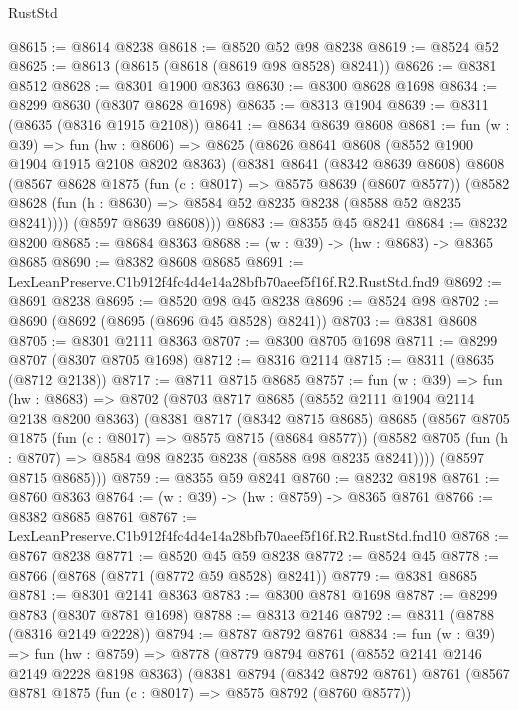\begin{lexlean}{RustStd}
\begin{coremodule}
@8615 := @8614 @8238
@8618 := @8520 @52 @98 @8238
@8619 := @8524 @52
@8625 := @8613 (@8615 (@8618 (@8619 @98 @8528) @8241))
@8626 := @8381 @8512
@8628 := @8301 @1900 @8363
@8630 := @8300 @8628 @1698
@8634 := @8299 @8630 (@8307 @8628 @1698)
@8635 := @8313 @1904
@8639 := @8311 (@8635 (@8316 @1915 @2108))
@8641 := @8634 @8639 @8608
@8681 := fun (w : @39) =>
  fun (hw : @8606) =>
  @8625
    (@8626
      @8641
      @8608
      (@8552 @1900 @1904 @1915 @2108 @8202 @8363)
      (@8381
        @8641
        (@8342 @8639 @8608)
        @8608
        (@8567
          @8628
          @1875
          (fun (c : @8017) => @8575 @8639 (@8607 @8577))
          (@8582 @8628 (fun (h : @8630) => @8584 @52 @8235 @8238 (@8588 @52 @8235 @8241))))
        (@8597 @8639 @8608)))
@8683 := @8355 @45 @8241
@8684 := @8232 @8200
@8685 := @8684 @8363
@8688 := (w : @39) -> (hw : @8683) -> @8365 @8685
@8690 := @8382 @8608 @8685
@8691 := LexLeanPreserve.C1b912f4fc4d4e14a28bfb70aeef5f16f.R2.RustStd.fnd9
@8692 := @8691 @8238
@8695 := @8520 @98 @45 @8238
@8696 := @8524 @98
@8702 := @8690 (@8692 (@8695 (@8696 @45 @8528) @8241))
@8703 := @8381 @8608
@8705 := @8301 @2111 @8363
@8707 := @8300 @8705 @1698
@8711 := @8299 @8707 (@8307 @8705 @1698)
@8712 := @8316 @2114
@8715 := @8311 (@8635 (@8712 @2138))
@8717 := @8711 @8715 @8685
@8757 := fun (w : @39) =>
  fun (hw : @8683) =>
  @8702
    (@8703
      @8717
      @8685
      (@8552 @2111 @1904 @2114 @2138 @8200 @8363)
      (@8381
        @8717
        (@8342 @8715 @8685)
        @8685
        (@8567
          @8705
          @1875
          (fun (c : @8017) => @8575 @8715 (@8684 @8577))
          (@8582 @8705 (fun (h : @8707) => @8584 @98 @8235 @8238 (@8588 @98 @8235 @8241))))
        (@8597 @8715 @8685)))
@8759 := @8355 @59 @8241
@8760 := @8232 @8198
@8761 := @8760 @8363
@8764 := (w : @39) -> (hw : @8759) -> @8365 @8761
@8766 := @8382 @8685 @8761
@8767 := LexLeanPreserve.C1b912f4fc4d4e14a28bfb70aeef5f16f.R2.RustStd.fnd10
@8768 := @8767 @8238
@8771 := @8520 @45 @59 @8238
@8772 := @8524 @45
@8778 := @8766 (@8768 (@8771 (@8772 @59 @8528) @8241))
@8779 := @8381 @8685
@8781 := @8301 @2141 @8363
@8783 := @8300 @8781 @1698
@8787 := @8299 @8783 (@8307 @8781 @1698)
@8788 := @8313 @2146
@8792 := @8311 (@8788 (@8316 @2149 @2228))
@8794 := @8787 @8792 @8761
@8834 := fun (w : @39) =>
  fun (hw : @8759) =>
  @8778
    (@8779
      @8794
      @8761
      (@8552 @2141 @2146 @2149 @2228 @8198 @8363)
      (@8381
        @8794
        (@8342 @8792 @8761)
        @8761
        (@8567
          @8781
          @1875
          (fun (c : @8017) => @8575 @8792 (@8760 @8577))

\end{coremodule}
\end{lexlean}
